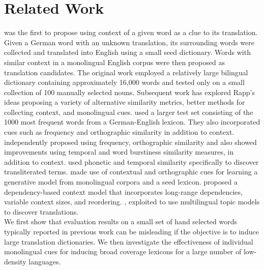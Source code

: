 \documentclass{article}
\begin{document}
\section{Related Work} \label{sect:relwork}


\cite{Rapp:1999} was the first to propose using context of a given word as a clue to its translation. Given a German word with an unknown translation, its surrounding words were collected and translated into English using a small seed dictionary.  Words with similar context in a monolingual English corpus were then proposed as translation candidates.  The original work employed a relatively large bilingual dictionary containing approximately 16,000 words and tested only on a small collection of 100 manually selected nouns.  Subsequent work has explored Rapp's ideas proposing a variety of alternative similarity metrics, better methods for collecting context, and monolingual cues.  \cite{Koehn:2002} used a larger test set consisting of the 1000 most frequent words from a German-English lexicon. They also incorporated cues such as frequency and orthographic similarity in addition to context. \cite{Schafer:2002} independently proposed using frequency, orthographic similarity and also showed improvements using temporal and word burstiness similarity measures, in addition to context.  \cite{Klementiev:2006b} used phonetic and temporal similarity specifically to discover transliterated terms.  \cite{Haghighi:2008} made use of contextual and orthographic cues for learning a generative model from monolingual corpora and a seed lexicon.  \cite{Garera:2009} proposed a dependency-based context model that incorporates long-range dependencies, variable context sizes, and reordering.  \cite{Mimno:2009}, \cite{Boyd-Graber:2009} exploited to use multilingual topic models to discover translations.\\

We first show that evaluation results on a small set of hand selected words typically reported in previous work can be misleading if the objective is to induce large translation dictionaries.  We then investigate the effectiveness of individual monolingual cues for inducing broad coverage lexicons for a large number of low-density languages. \\
\end{document}
